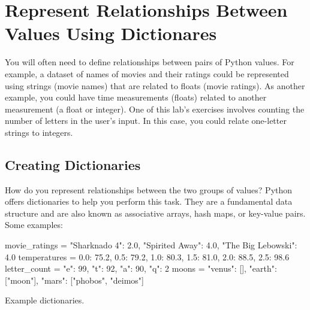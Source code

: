\documentclass[11pt]{cselabheader}
\begin{document}
\section{Represent Relationships Between Values Using Dictionares}

You will often need to define relationships between pairs of Python values.
For example, a dataset of names of movies and their ratings could be represented using strings (movie names)
that are related to floats (movie ratings).
As another example, you could have time measurements (floats) related to another measurement (a float or integer).
One of this lab's exercises involves counting the number of letters in the user's input.
In this case, you could relate one-letter strings to integers.

\subsection{Creating Dictionaries}

How do you represent relationships between the two groups of values?
Python offers dictionaries to help you perform this task.
They are a fundamental data structure and are also known as associative arrays, hash maps, or key-value pairs.
Some examples:

\begin{listing}
\begin{python3code}
movie_ratings = {"Sharknado 4": 2.0, "Spirited Away": 4.0, "The Big Lebowski": 4.0}
temperatures = {0.0: 75.2, 0.5: 79.2, 1.0: 80.3, 1.5: 81.0, 2.0: 88.5, 2.5: 98.6}
letter_count = {"e": 99, "t": 92, "a": 90, "q": 2}
moons = {"venus": [], "earth": ["moon"], "mars": ["phobos", "deimos"]}
\end{python3code}
\caption{Example dictionaries.}\label{lst:dicts}
\end{listing}
\end{document}
